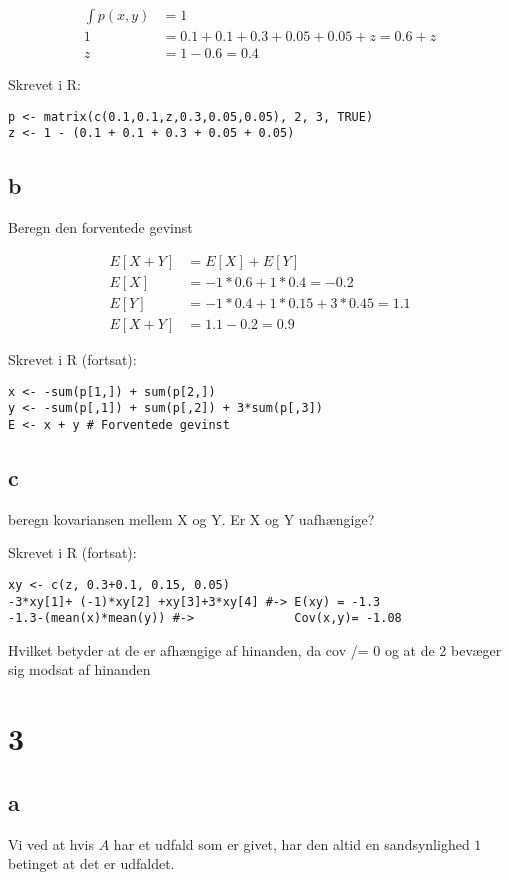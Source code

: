 \documentclass[11pt]{article}
\begin{document}
\begin{align}
\int p(x,y) &= 1 \\
1 &= 0.1 + 0.1 + 0.3 + 0.05 + 0.05 + z = 0.6 + z \\
z &= 1 - 0.6 = 0.4
\end{align}

Skrevet i R:
\begin{verbatim}
p <- matrix(c(0.1,0.1,z,0.3,0.05,0.05), 2, 3, TRUE)
z <- 1 - (0.1 + 0.1 + 0.3 + 0.05 + 0.05)
\end{verbatim}
\subsection*{b}
\label{sec:orge281eb0}
Beregn den forventede gevinst

\begin{align}
E[X+Y] &= E[X] + E[Y] \\
E[X] &= -1*0.6 + 1*0.4 = -0.2 \\
E[Y] &= -1*0.4 + 1*0.15 + 3*0.45 = 1.1 \\
E[X+Y] &= 1.1 - 0.2 = 0.9
\end{align}

Skrevet i R (fortsat):

\begin{verbatim}
x <- -sum(p[1,]) + sum(p[2,])
y <- -sum(p[,1]) + sum(p[,2]) + 3*sum(p[,3])
E <- x + y # Forventede gevinst
\end{verbatim}
\subsection*{c}
\label{sec:org30d2f7e}
beregn kovariansen mellem X og Y. Er X og Y uafhængige?

Skrevet i R (fortsat):
\begin{verbatim}
xy <- c(z, 0.3+0.1, 0.15, 0.05)
-3*xy[1]+ (-1)*xy[2] +xy[3]+3*xy[4] #-> E(xy) = -1.3
-1.3-(mean(x)*mean(y)) #->              Cov(x,y)= -1.08
\end{verbatim}

Hvilket betyder at de er afhængige af hinanden, da cov /= 0 og at de 2 bevæger sig modsat af hinanden

\section*{3}
\label{sec:org1a52b58}
\subsection*{a}
\label{sec:org610609b}
Vi ved at hvis \(A\) har et udfald som er givet,
har den altid en sandsynlighed \(1\) betinget at det er udfaldet.
\end{document}
